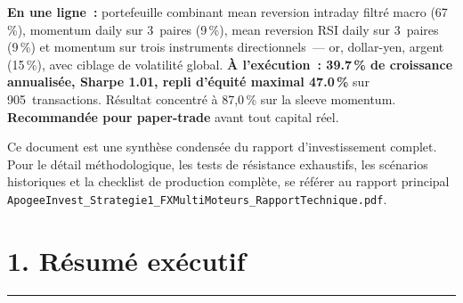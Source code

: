 \documentclass[11pt, a4paper]{scrartcl}
\begin{document}
\vspace{0.8cm}

\begin{thesisbox}
\textbf{En une ligne~:} portefeuille combinant mean reversion intraday filtré macro
(67\,\%), momentum daily sur 3~paires (9\,\%), mean reversion RSI daily sur 3~paires
(9\,\%) et momentum sur trois instruments directionnels~--- or, dollar-yen, argent
(15\,\%), avec ciblage de volatilité global.
\textbf{À l'exécution~: 39.7\,\% de croissance annualisée, Sharpe
1.01, repli d'équité maximal 47.0\,\%} sur
905~transactions. Résultat concentré à 87,0\,\% sur la sleeve momentum.
\textbf{Recommandée pour paper-trade} avant tout capital réel.
\end{thesisbox}

\vspace{0.4cm}

{\small\color{slateGrey}\sffamily
Ce document est une synthèse condensée du rapport d'investissement complet. Pour le détail
méthodologique, les tests de résistance exhaustifs, les scénarios historiques et la
checklist de production complète, se référer au rapport principal \texttt{ApogeeInvest\_Strategie1\_FXMultiMoteurs\_RapportTechnique.pdf}.}

\vfill

\noindent\colorbox{lightGrey}{%
}

\vspace{0.3cm}

\noindent{\color{apogeeGold}\rule{\textwidth}{2pt}}

\clearpage

\section*{1. Résumé exécutif}
\vspace{-0.4em}
{\color{accent}\rule{\linewidth}{1.0pt}}\\[0.4em]
\end{document}
